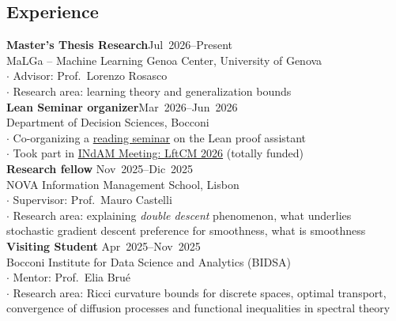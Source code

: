 \documentclass[margin,line]{res}
\begin{document}
\begin{resume}
\section{\sc Experience}
{\bf Master's Thesis Research}\hfill Jul~2026--Present\vspace*{0.7mm}\\
{MaLGa -- Machine Learning Genoa Center, University of Genova}\vspace*{0.5mm}\\
{\small $\cdot$ Advisor: Prof.\ Lorenzo Rosasco}\\
{\small $\cdot$ Research area: learning theory and generalization bounds \vspace{2mm}}\\
{\bf Lean Seminar organizer}\hfill Mar~2026--Jun~2026\vspace*{0.7mm}\\
{Department of Decision Sciences, Bocconi}\vspace*{0.5mm}\\
{\small $\cdot$ Co-organizing a \href{https://matildedol.github.io/files/Poster.pdf}{reading seminar} on the Lean proof assistant}\\
{\small $\cdot$ Took part in \href{https://amosturchet.github.io/lftcm26/index.html}{INdAM Meeting: LftCM 2026} (totally funded)}\vspace{2mm}\\
{\bf Research fellow }\hfill Nov~2025--Dic~2025\vspace*{0.7mm}\\
{ NOVA Information Management School, Lisbon}\vspace*{0.5mm}\\
{\small $\cdot$ Supervisor: Prof.\ Mauro Castelli}\\
{\small $\cdot$ Research area: explaining \textit{double descent} phenomenon, what underlies\\ stochastic gradient descent preference for smoothness, what is smoothness
\vspace{2mm}}\\
{\bf Visiting Student}
\hfill Apr~2025--Nov~2025\vspace*{0.7mm}\\
{ Bocconi Institute for Data Science and Analytics (BIDSA)}\vspace*{0.5mm}\\
{\small $\cdot$ Mentor: Prof.\ Elia Bru\'e}\\
{\small $\cdot$ Research area: Ricci curvature bounds for discrete spaces, optimal transport,\\ convergence of diffusion processes and functional inequalities in spectral theory}\\

\end{resume}
\end{document}
